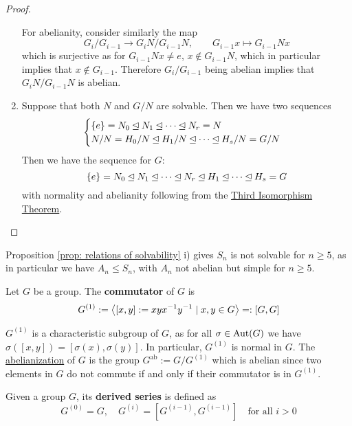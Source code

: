 \documentclass{article}
\begin{document}
\begin{proof}
\begin{enumerate}[label=\roman*)]
        For abelianity, consider similarly the map 
        \[
            G_i/G_{i-1} \to G_i N/G_{i-1} N, \qquad G_{i-1}x\mapsto G_{i-1}Nx
        \]
        which is surjective as for $G_{i-1}Nx \neq e$, $x \notin G_{i-1}N$, which in particular implies that $x \notin G_{i-1}$. Therefore $G_i/G_{i-1}$ being abelian implies that $G_i N/G_{i-1} N$ is abelian.
        \item Suppose that both $N$ and $G/N$ are solvable. Then we have two sequences
        \[
            \begin{cases}
                \{e\} = N_0 \unlhd N_1 \unlhd \cdots \unlhd N_r = N \\
                N/N = H_0/N \unlhd H_1/N \unlhd \cdots \unlhd H_s/N = G/N
            \end{cases}
        \]
        Then we have the sequence for $G$:
        \[
            \{e\} = N_0 \unlhd N_1 \unlhd \cdots \unlhd N_r \unlhd H_1 \unlhd \cdots \unlhd H_s = G
        \]
        with normality and abelianity following from the \hyperref[thm: third isomorphism theorem]{Third Isomorphism Theorem}.
    \end{enumerate}
\end{proof}

\begin{corollary}
    Proposition \ref{prop: relations of solvability} i) gives $S_n$ is not solvable for $n \geq 5$, as in particular we have $A_n \leq S_n$, with $A_n$ not abelian but simple for $n \geq 5$.
\end{corollary}

\begin{definition}[Commutator]
    Let $G$ be a group. The \textbf{commutator} of $G$ is 
    \[
        G^{(1)} := \left\langle [x, y] := x y x^{-1} y^{-1} \mid x, y \in G \right\rangle =: [G, G]
    \]
\end{definition}

\begin{remark}\label{rmk: abelianization}
    $G^{(1)}$ is a characteristic subgroup of $G$, as for all $\sigma \in \mathrm{Aut}(G)$ we have $\sigma([x, y]) = [\sigma(x), \sigma(y)]$. In particular, $G^{(1)}$ is normal in $G$. The \underline{abelianization} of $G$ is the group $G^{\mathrm{ab}} := G/G^{(1)}$ which is abelian since two elements in $G$ do not commute if and only if their commutator is in $G^{(1)}$.
\end{remark}

\begin{definition}
    Given a group $G$, its \textbf{derived series} is defined as
    \[
        G^{(0)} = G, \quad G^{(i)} = [G^{(i-1)}, G^{(i-1)}] \quad \text{for all $i > 0$}
    \]
\end{definition}
\end{document}
